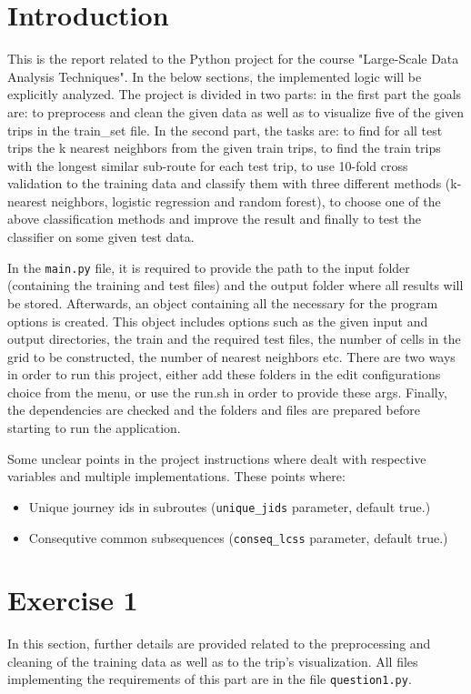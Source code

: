 \documentclass[12pt]{article}
\begin{document}
	\section{Introduction}
    This is the report related to the Python project for the course "Large-Scale Data Analysis Techniques". In the below sections, the implemented logic will be explicitly analyzed. The project is divided in two parts: in the first part the goals are: to preprocess and clean the given data as well as to visualize five of the given trips in the train\_set file. In the second part, the tasks are: to find for all test trips the k nearest neighbors from the given train trips, to find the train trips with the longest similar sub-route for each test trip, to use 10-fold cross validation to the training data and classify them with three different methods (k-nearest neighbors, logistic regression and random forest), to choose one of the above classification methods and improve the result and finally to test the classifier on some given test data.
    
    In the \texttt{main.py} file, it is required to provide the path to the input folder (containing the training and test files) and the output folder where all results will be stored. Afterwards, an object containing all the necessary for the program options is created. This object includes options such as the given input and output directories, the train and the required test files, the number of cells in the grid to be constructed, the number of nearest neighbors etc. There are two ways in order to run this project, either add these folders in the edit configurations choice from the menu, or use the run.sh in order to provide these args. Finally, the dependencies are checked and the folders and files are prepared before starting to run the application.

  Some unclear points in the project instructions where dealt with respective
  variables and multiple implementations. These points where:
  \begin{itemize}
  \item Unique journey ids in subroutes (\texttt{unique\_jids} parameter,
    default true.)
    \item Consequtive common subsequences (\texttt{conseq\_lcss} parameter,
      default true.)
    \end{itemize}
    
	\section{Exercise 1}
	In this section, further details are provided related to the preprocessing and cleaning of the training data as well as to the trip's visualization. All files implementing the requirements of this part are in the file \texttt{question1.py}.
	
\end{document}
